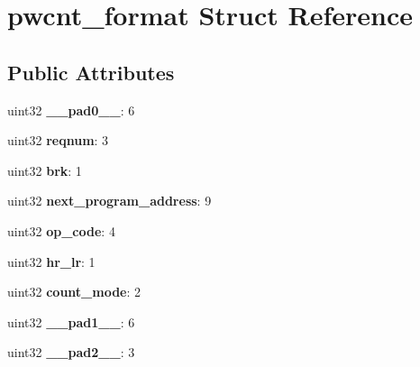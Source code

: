 \hypertarget{structpwcnt__format}{}\section{pwcnt\+\_\+format Struct Reference}
\label{structpwcnt__format}
\subsection*{Public Attributes}
\begin{DoxyCompactItemize}
\item 
\mbox{\label{structpwcnt__format_afefdd005b6104f52ff69c949fd5280b3}} 
uint32 {\bfseries \+\_\+\+\_\+pad0\+\_\+\+\_\+}\+: 6
\item 
\mbox{\label{structpwcnt__format_a3f984d4ad1daade7e5431af8ce52386c}} 
uint32 {\bfseries reqnum}\+: 3
\item 
\mbox{\label{structpwcnt__format_a4c2e1976ad06074cad2c5ec95a314f7c}} 
uint32 {\bfseries brk}\+: 1
\item 
\mbox{\label{structpwcnt__format_aebd8d2f623fd4dff3211a0452a45a013}} 
uint32 {\bfseries next\+\_\+program\+\_\+address}\+: 9
\item 
\mbox{\label{structpwcnt__format_af8c86f977cad88aa345401fe0073a47b}} 
uint32 {\bfseries op\+\_\+code}\+: 4
\item 
\mbox{\label{structpwcnt__format_a849fe5625181d0a952bb0361a190d2e1}} 
uint32 {\bfseries hr\+\_\+lr}\+: 1
\item 
\mbox{\label{structpwcnt__format_a3a2ac10e8ba82311bac889204f2b202d}} 
uint32 {\bfseries count\+\_\+mode}\+: 2
\item 
\mbox{\label{structpwcnt__format_ab9c905b9340a58d687fba4517bbb9531}} 
uint32 {\bfseries \+\_\+\+\_\+pad1\+\_\+\+\_\+}\+: 6
\item 
\mbox{\label{structpwcnt__format_a065bf52d2365d4913f8ca96bfac88072}} 
uint32 {\bfseries \+\_\+\+\_\+pad2\+\_\+\+\_\+}\+: 3

\end{DoxyCompactItemize}
